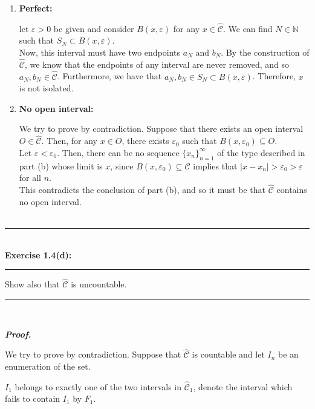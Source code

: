 \documentclass[a4paper,11pt]{article}
\begin{document}
\begin{enumerate}

	\item \textbf{Perfect:}

		let $\varepsilon > 0$ be given and consider $B(x, \varepsilon)$ for any $x \in \hat{\mathcal{C}}$. We can find $N \in \mathbb{N}$ such that $S_N \subset B(x, \varepsilon)$.\\

		Now, this interval must have two endpoints $a_N$ and $b_N$. By the construction of $\hat{\mathcal{C}}$, we know that the endpoints of any interval are never removed, and so $a_N, b_N \in \hat{\mathcal{C}}$. Furthermore, we have that $a_N, b_N \in S_N \subset B(x, \varepsilon)$. Therefore, $x$ is not isolated.\\

	\item \textbf{No open interval:}

		We try to prove by contradiction. Suppose that there exists an open interval $O \in \hat{\mathcal{C}}$. Then, for any $x \in O$, there exists $\varepsilon_0$ such that $B(x, \varepsilon_0) \subseteq O$.\\

		Let $\varepsilon < \varepsilon_0$. Then, there can be no sequence $\{x_n\}_{n=1}^\infty$ of the type described in part (b) whose limit is $x$, since $B(x, \varepsilon_0) \subseteq \hat{\mathcal{C}}$ implies that $|x - x_n| > \varepsilon_0 > \varepsilon$ for all $n$.\\

		This contradicts the conclusion of part (b), and so it must be that $\hat{\mathcal{C}}$ contains no open interval.\\\\


\end{enumerate}

\begin{flushleft}
	\rule[-0.5ex]{17cm}{2pt}\\
		\textbf{Exercise 1.4(d):}\\
	\rule[1.5ex]{17cm}{0.5pt}
		Show also that $\hat{\mathcal{C}}$ is uncountable.
	\rule[1.0ex]{17cm}{0.5pt}\
\end{flushleft}

\textbf{\textit{Proof.}}

We try to prove by contradiction. Suppose that $\hat{\mathcal{C}}$ is countable and let $I_n$ be an enumeration of the set.

$I_1$ belongs to exactly one of the two intervals in $\hat{\mathcal{C}}_1$, denote the interval which fails to contain $I_1$ by $F_1$.
\end{document}
